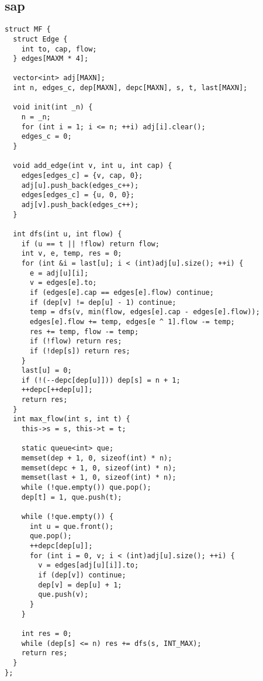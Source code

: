 \documentclass[twoside]{article}
\begin{document}
\subsection{sap}
\begin{lstlisting}
struct MF {
  struct Edge {
    int to, cap, flow;
  } edges[MAXM * 4];

  vector<int> adj[MAXN];
  int n, edges_c, dep[MAXN], depc[MAXN], s, t, last[MAXN];

  void init(int _n) {
    n = _n;
    for (int i = 1; i <= n; ++i) adj[i].clear();
    edges_c = 0;
  }

  void add_edge(int v, int u, int cap) {
    edges[edges_c] = {v, cap, 0};
    adj[u].push_back(edges_c++);
    edges[edges_c] = {u, 0, 0};
    adj[v].push_back(edges_c++);
  }

  int dfs(int u, int flow) {
    if (u == t || !flow) return flow;
    int v, e, temp, res = 0;
    for (int &i = last[u]; i < (int)adj[u].size(); ++i) {
      e = adj[u][i];
      v = edges[e].to;
      if (edges[e].cap == edges[e].flow) continue;
      if (dep[v] != dep[u] - 1) continue;
      temp = dfs(v, min(flow, edges[e].cap - edges[e].flow));
      edges[e].flow += temp, edges[e ^ 1].flow -= temp;
      res += temp, flow -= temp;
      if (!flow) return res;
      if (!dep[s]) return res;
    }
    last[u] = 0;
    if (!(--depc[dep[u]])) dep[s] = n + 1;
    ++depc[++dep[u]];
    return res;
  }
  int max_flow(int s, int t) {
    this->s = s, this->t = t;

    static queue<int> que;
    memset(dep + 1, 0, sizeof(int) * n);
    memset(depc + 1, 0, sizeof(int) * n);
    memset(last + 1, 0, sizeof(int) * n);
    while (!que.empty()) que.pop();
    dep[t] = 1, que.push(t);

    while (!que.empty()) {
      int u = que.front();
      que.pop();
      ++depc[dep[u]];
      for (int i = 0, v; i < (int)adj[u].size(); ++i) {
        v = edges[adj[u][i]].to;
        if (dep[v]) continue;
        dep[v] = dep[u] + 1;
        que.push(v);
      }
    }

    int res = 0;
    while (dep[s] <= n) res += dfs(s, INT_MAX);
    return res;
  }
};

\end{lstlisting}
\end{document}
